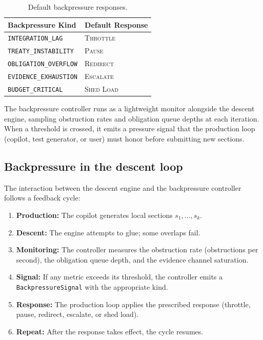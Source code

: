 \documentclass[11pt]{article}
\begin{document}
\begin{table}[ht]
\centering
\caption{Default backpressure responses.}
\label{tab:backpressure-map}
\begin{tabular}{@{}ll@{}}
\toprule
\textbf{Backpressure Kind} & \textbf{Default Response} \\
\midrule
\texttt{INTEGRATION\_LAG}     & \textsc{Throttle} \\
\texttt{TREATY\_INSTABILITY}  & \textsc{Pause} \\
\texttt{OBLIGATION\_OVERFLOW} & \textsc{Redirect} \\
\texttt{EVIDENCE\_EXHAUSTION} & \textsc{Escalate} \\
\texttt{BUDGET\_CRITICAL}     & \textsc{Shed Load} \\
\bottomrule
\end{tabular}
\end{table}

\noindent
The backpressure controller runs as a lightweight monitor alongside the
descent engine, sampling obstruction rates and obligation queue depths at
each iteration.  When a threshold is crossed, it emits a pressure signal
that the production loop (copilot, test generator, or user) must honor
before submitting new sections.

\subsection{Backpressure in the descent loop}

The interaction between the descent engine and the backpressure controller
follows a feedback cycle:

\begin{enumerate}[leftmargin=*]
\item \textbf{Production:} The copilot generates local sections
  $s_1, \ldots, s_k$.
\item \textbf{Descent:} The engine attempts to glue; some overlaps fail.
\item \textbf{Monitoring:} The controller measures the obstruction rate
  (obstructions per second), the obligation queue depth, and the evidence
  channel saturation.
\item \textbf{Signal:} If any metric exceeds its threshold, the controller
  emits a \texttt{BackpressureSignal} with the appropriate kind.
\item \textbf{Response:} The production loop applies the prescribed
  response (throttle, pause, redirect, escalate, or shed load).
\item \textbf{Repeat:} After the response takes effect, the cycle resumes.
\end{enumerate}
\end{document}
